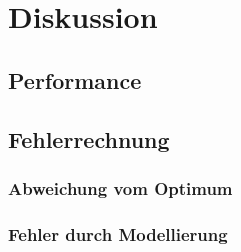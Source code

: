 \documentclass{article}
\begin{document}
\clearpage
\section{Diskussion}

\subsection{Performance}

\subsection{Fehlerrechnung}

\subsubsection{Abweichung vom Optimum}

\subsubsection{Fehler durch Modellierung}
\end{document}
